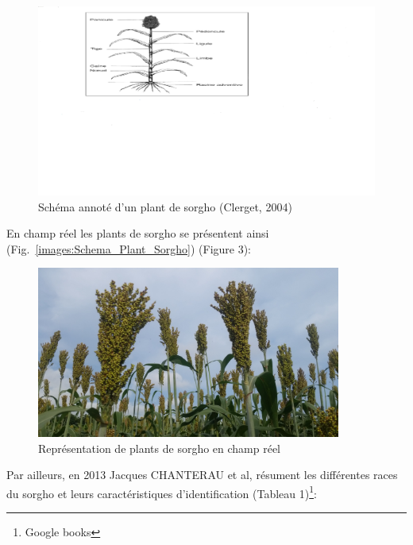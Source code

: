 \documentclass[a4paper,11pt]{article}
\begin{document}

\begin{figure}%
  \begin{center}
    \includegraphics[width=18cm]{images/Schema_Plant_Sorgho}
  \end{center}
\caption{Schéma annoté d’un plant de sorgho (Clerget, 2004)}
\end{figure}


En champ réel les plants de sorgho se présentent ainsi (Fig.~\ref{images:Schema_Plant_Sorgho})
(Figure 3):

\begin{figure}%
  \begin{center}
    \includegraphics[width=10cm]{images/PlantDeSorgho}
  \end{center}
\caption{Représentation de plants de sorgho en champ réel}
\end{figure}

Par ailleurs, en 2013 Jacques CHANTERAU et al, résument les
différentes races du sorgho et leurs caractéristiques d'identification
(Tableau 1)\footnote{Google books}:

\end{document}
